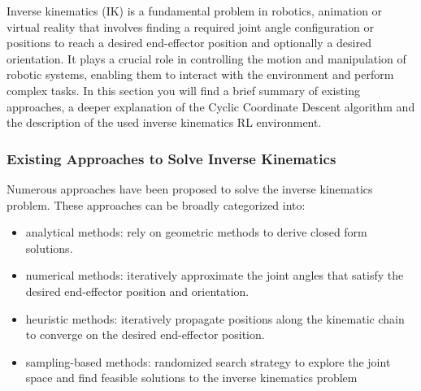 Inverse kinematics (IK) is a fundamental problem in robotics, animation or virtual reality that involves finding a required joint angle configuration or positions to reach a desired end-effector position and optionally a desired orientation. It plays a crucial role in controlling the motion and manipulation of robotic systems, enabling them to interact with the environment and perform complex tasks. 
In this section you will find a brief summary of existing approaches, a deeper explanation of the Cyclic Coordinate Descent algorithm and the description of the used inverse kinematics RL environment.

\subsubsection{Existing Approaches to Solve Inverse Kinematics}

Numerous approaches have been proposed to solve the inverse kinematics problem. These approaches can be broadly categorized into: 
\begin{itemize}
	\item analytical methods: rely on geometric methods to derive closed form solutions.
	\item numerical methods: iteratively approximate the joint angles that satisfy the desired end-effector position and orientation.
	\item heuristic methods: iteratively propagate positions along the kinematic chain to converge on the desired end-effector position.
	\item sampling-based methods: randomized search strategy to explore the joint space and find feasible solutions to the inverse kinematics problem
\end{itemize}



